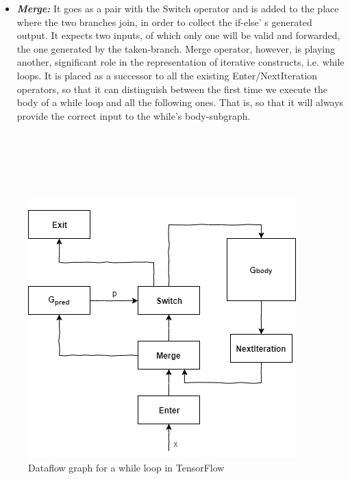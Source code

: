 \documentclass[ack,preface]{dithesis}
\begin{document}
\begin{itemize}
    \item \textit{\textbf{Merge:}} It goes as a pair with the Switch operator and is added to the place where the two branches join, in order to collect the if-else' s generated output. It expects two inputs, of which only one will be valid and forwarded, the one generated by the taken-branch. Merge operator, however, is playing another, significant role in the representation of iterative constructs, i.e. while loops. It is placed as a successor to all the existing Enter/NextIteration operators, so that it can distinguish between the first time we execute the body of a while loop and all the following ones. That is, so that  it will always provide the correct input to the while's body-subgraph. \\\\\\\\\\\

    \end{itemize}

\begin{figure}
\centering
\includegraphics[scale=0.85]{figures/while}
\caption{ Dataflow graph for a while loop in TensorFlow}
\end{figure}
\end{document}
